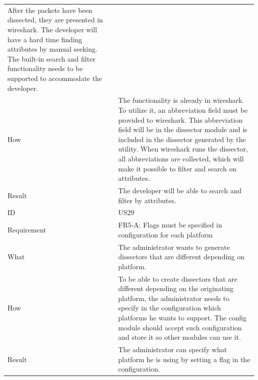\begin{table}[htbp]
{\begin{tabularx}{1.2\textwidth}{l X}
	After the \glspl{packet} have been dissected, they are presented in \Gls{wireshark}. The developer will have a hard time finding 
	attributes by manual seeking. The built-in search and filter functionality needs to be supported to accommodate the developer. \\
	How & The functionality is already in \Gls{wireshark}. To utilize it, an abbreviation field must be provided to \Gls{wireshark}. This abbreviation field will be in the \gls{dissector} module
	and is included in the \gls{dissector} generated by the \gls{utility}. When \Gls{wireshark} runs the \gls{dissector}, all abbreviations are collected, which will make it possible to filter and search
	on attributes. \\
	Result & The developer will be able to search and filter by attributes. \\
	\midrule
	ID & US29 \\
	Requirement & FR5-A: Flags must be specified in configuration for each platform \\
	What & The administrator wants to generate \glspl{dissector} that are different depending on platform. \\
	How & To be able to create \glspl{dissector} that are different depending on the originating platform, the administrator needs to specify in the configuration which platforms he wants to support.
	The config module should accept such configuration and store it so other modules can use it. \\ 
	Result & The administrator can specify what platform he is using by setting a flag in the configuration. \\
	\midrule
\end{tabularx}}
\end{table}

